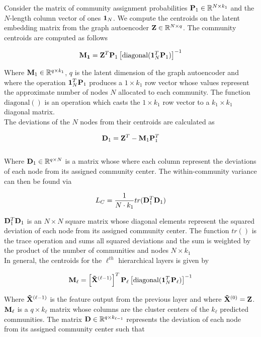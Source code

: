 \documentclass[a4paper,12pt]{article}
\begin{document}
\begin{itemize}
\begin{enumerate}
{{\begin{enumerate}
{					Consider the matrix of community assignment probabilities ${\bf P}_1\in \mathbb{R}^{N\times k_1}$ and the $N$-length column vector of ones ${\bf 1}_N$. We compute the centroids on the latent embedding matrix from the graph autoencoder ${\bf Z}\in \mathbb{R}^{N\times q}$. The community centroids are computed as follows
					
					\[ {\bf M_1} = {\bf Z}^T{\bf P}_1 \left[\text{diagonal}({\bf 1}_N^T {\bf P}_1)\right]^{-1}\]
					
					Where ${\bf M}_1 \in \mathbb{R}^{q\times k_1}$, $q$ is the latent dimension of the graph autoencoder and where the operation ${\bf 1}_N^T {\bf P}_1$ produces a $1 \times k_1$ row vector whose values represent the approximate number of nodes $N$ allocated to each community. The function $\text{diagonal}()$ is an operation which casts the $1 \times k_1$ row vector to a $k_1 \times k_1$ diagonal matrix. \\
					
					The deviations of the $N$ nodes from their centroids are calculated as 
					
					\[ {\bf D}_1 ={\bf Z}^T - {\bf M}_1{\bf P}_1^T \]\\
					
					Where ${\bf D}_1\in \mathbb{R}^{q\times N}$ is a matrix whose where each column represent the deviations of each node from its assigned community center. The within-community variance can then be found via
					
					\[L_C = \frac{1}{N \cdot k_1} tr({\bf D}_1^T {\bf D}_1)\]
					
					${\bf D}_1^T {\bf D}_1$ is an $N\times N$ square matrix whose diagonal elements represent the squared deviation of each node from its assigned community center. The function $tr()$ is the trace operation and sums all squared deviations and the sum is weighted by the product of the number of communities and nodes $N\times k_1$ \\
					
					In general, the centroids for the $\ell^{th}$ hierarchical layers is given by
					
					\[ {\bf M_\ell} = \left[{\bf \tilde X}^{(\ell-1)}\right]^T{\bf P}_\ell \left[\text{diagonal}({\bf 1}_N^T {\bf P}_\ell)\right]^{-1}\]
					
					Where ${\bf \tilde X}^{(\ell-1)}$ is the feature output from the previous layer and where ${\bf \tilde X}^{(0)} = {\bf Z}$. $\bf M_\ell$ is a $q\times k_\ell$ matrix whose columns are the cluster centers of the $k_\ell$ predicted communities. The matrix ${\bf D}\in\mathbb{R}^{q\times k_{\ell-1}}$ represents the deviation of each node from its assigned community center such that
					
}
\end{enumerate}}}
\end{enumerate}
\end{itemize}
\end{document}

